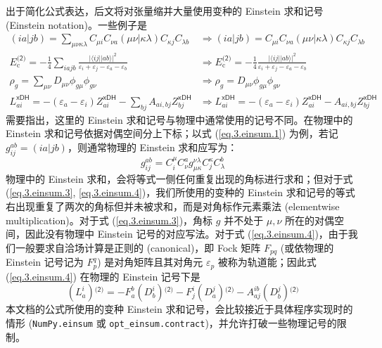 出于简化公式表达，后文将对张量缩并大量使用变种的 Einstein 求和记号 (Einstein notation)。一些例子是
\begin{subequations}
\begin{align}
  \label{eq.3.einsum.1}
  (ia|jb) = \sum_{\mu \nu \kappa \lambda} C_{\mu i} C_{\nu a} (\mu \nu | \kappa \lambda) C_{\kappa j} C_{\lambda b}
  &\Rightarrow 
  (ia|jb) = C_{\mu i} C_{\nu a} (\mu \nu | \kappa \lambda) C_{\kappa j} C_{\lambda b} \\
  \label{eq.3.einsum.2}
  E_\mathrm{c}^\textsf{(2)} = - \frac{1}{4} \sum_{iajb} \frac{\big| \langle i j || a b \rangle \big|^2}{\varepsilon_i + \varepsilon_j - \varepsilon_a - \varepsilon_b}
  &\Rightarrow
  E_\mathrm{c}^\textsf{(2)} = - \frac{1}{4} \frac{\big| \langle i j || a b \rangle \big|^2}{\varepsilon_i + \varepsilon_j - \varepsilon_a - \varepsilon_b} \\
  \label{eq.3.einsum.3}
  \rho_g = \sum_{\mu \nu} D_{\mu \nu} \phi_{g \mu} \phi_{g \nu}
  &\Rightarrow
  \rho_g = D_{\mu \nu} \phi_{g \mu} \phi_{g \nu} \\
  \label{eq.3.einsum.4}
  L_{ai}^\textsf{xDH} = - (\varepsilon_a - \varepsilon_i) Z_{ai}^\textsf{xDH} - \sum_{bj} A_{ai, bj} Z_{bj}^\textsf{xDH}
  &\Rightarrow
  L_{ai}^\textsf{xDH} = - (\varepsilon_a - \varepsilon_i) Z_{ai}^\textsf{xDH} - A_{ai, bj} Z_{bj}^\textsf{xDH}
\end{align}
\end{subequations}
需要指出，这里的 Einstein 求和记号与物理中通常使用的记号不同\cite{Einstein-Einstein.AP.1916}。在物理中的 Einstein 求和记号依据对偶空间分上下标；以式 (\ref{eq.3.einsum.1}) 为例，若记 $g_{ij}^{ab} = (ia|jb)$，则通常物理的 Einstein 求和应写为：
\begin{equation*}
  g_{ij}^{ab} = C^\mu_i C^a_\nu g^{\nu \lambda}_{\mu \kappa} C^\kappa_j C^b_\lambda
\end{equation*}
物理中的 Einstein 求和，会将等式一侧任何重复出现的角标进行求和；但对于式 (\ref{eq.3.einsum.3}, \ref{eq.3.einsum.4})，我们所使用的变种的 Einstein 求和记号的等式右出现重复了两次的角标但并未被求和，而是对角标作元素乘法 (elementwise multiplication)。对于式 (\ref{eq.3.einsum.3})，角标 $g$ 并不处于 $\mu, \nu$ 所在的对偶空间，因此没有物理中 Einstein 记号的对应写法。对于式 (\ref{eq.3.einsum.4})，由于我们一般要求自洽场计算是正则的 (canonical)，即 Fock 矩阵 $F_{pq}$ (或依物理的 Einstein 记号记为 $F_p^q$) 是对角矩阵且其对角元 $\varepsilon_p$ 被称为轨道能；因此式 (\ref{eq.3.einsum.4}) 在物理的 Einstein 记号下是
\begin{equation*}
  (L_a^i){}^\textsf{(2)} = - F_a^b (D_b^i){}^\textsf{(2)} - F_j^i (D_a^j){}^\textsf{(2)} - A_{aj}^{ib} (D_b^j){}^\textsf{(2)}
\end{equation*}
本文档的公式所使用的变种 Einstein 求和记号，会比较接近于具体程序实现时的情形 (\verb|NumPy.einsum| 或 \verb|opt_einsum.contract|)，并允许打破一些物理记号的限制。

